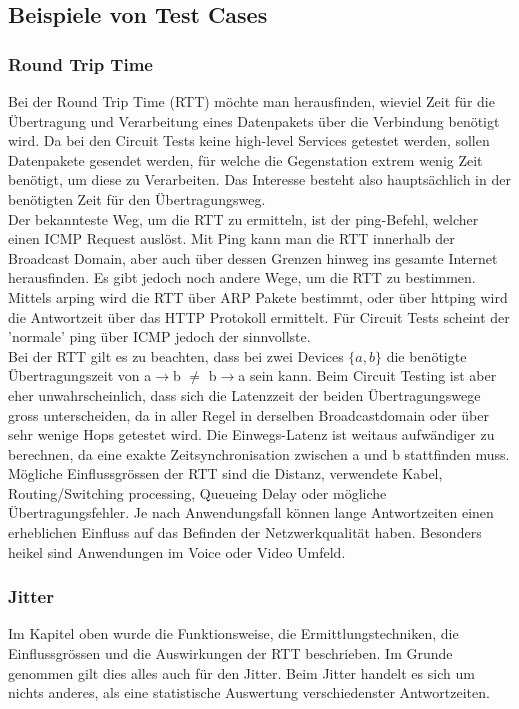 \documentclass[a4,12pt]{scrartcl}
\begin{document}
\subsection{Beispiele von Test Cases}
\subsubsection{Round Trip Time}
Bei der Round Trip Time (RTT) möchte man herausfinden, wieviel Zeit für die Übertragung und Verarbeitung eines Datenpakets über die Verbindung benötigt wird. Da bei den Circuit Tests keine high-level Services getestet werden, sollen Datenpakete gesendet werden, für welche die Gegenstation extrem wenig Zeit benötigt, um diese zu Verarbeiten. Das Interesse besteht also hauptsächlich in der benötigten Zeit für den Übertragungsweg.\\

\noindent Der bekannteste Weg, um die RTT zu ermitteln, ist der ping-Befehl, welcher einen ICMP Request auslöst. Mit Ping kann man die RTT innerhalb der Broadcast Domain, aber auch über dessen Grenzen hinweg ins gesamte Internet herausfinden. Es gibt jedoch noch andere Wege, um die RTT zu bestimmen. Mittels arping wird die RTT über ARP Pakete bestimmt, oder über httping wird die Antwortzeit über das HTTP Protokoll ermittelt. Für Circuit Tests scheint der 'normale' ping über ICMP jedoch der sinnvollste.\\

\noindent Bei der RTT gilt es zu beachten, dass bei zwei Devices $\{a,b\}$ die benötigte Übertragungszeit von a$\rightarrow$b $\neq$ b$\rightarrow$a sein kann. Beim Circuit Testing ist aber eher unwahrscheinlich, dass sich die Latenzzeit der beiden Übertragungswege gross unterscheiden, da in aller Regel in derselben Broadcastdomain oder über sehr wenige Hops getestet wird. Die Einwegs-Latenz ist weitaus aufwändiger zu berechnen, da eine exakte Zeitsynchronisation zwischen a und b stattfinden muss.\\

\noindent Mögliche Einflussgrössen der RTT sind die Distanz, verwendete Kabel, Routing/Switching processing, Queueing Delay oder mögliche Übertragungsfehler. Je nach Anwendungsfall können lange Antwortzeiten einen erheblichen Einfluss auf das Befinden der Netzwerkqualität haben. Besonders heikel sind Anwendungen im Voice oder Video Umfeld. 
\subsubsection{Jitter}
Im Kapitel oben wurde die Funktionsweise, die Ermittlungstechniken, die Einflussgrössen und die Auswirkungen der RTT beschrieben. Im Grunde genommen gilt dies alles auch für den Jitter. Beim Jitter handelt es sich um nichts anderes, als eine statistische Auswertung verschiedenster Antwortzeiten.\\
\end{document}
